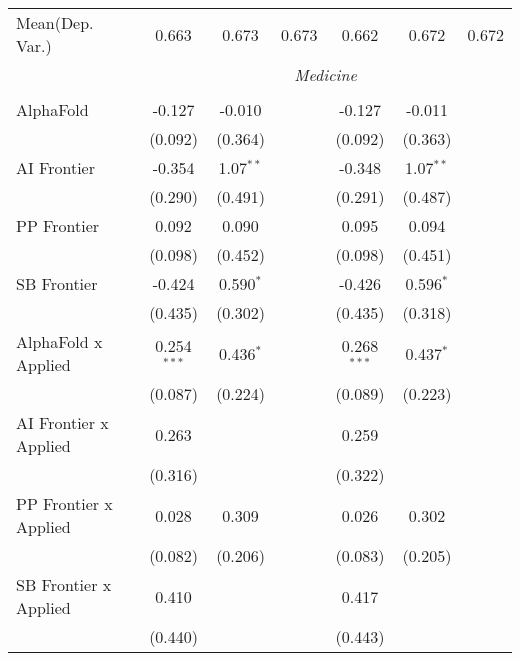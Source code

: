 \begin{tabular}{lcccccc}
Mean(Dep. Var.) & 0.663 & 0.673 & 0.673 & 0.662 & 0.672 & 0.672 \\
 & \multicolumn{6}{c}{\textit{Medicine}} \\ \\
   AlphaFold                    & -0.127        & -0.010      &              & -0.127        & -0.011      &   \\   
                                & (0.092)       & (0.364)     &              & (0.092)       & (0.363)     &   \\   
   AI Frontier                  & -0.354        & 1.07$^{**}$ &              & -0.348        & 1.07$^{**}$ &   \\   
                                & (0.290)       & (0.491)     &              & (0.291)       & (0.487)     &   \\   
   PP Frontier                  & 0.092         & 0.090       &              & 0.095         & 0.094       &   \\   
                                & (0.098)       & (0.452)     &              & (0.098)       & (0.451)     &   \\   
   SB Frontier                  & -0.424        & 0.590$^{*}$ &              & -0.426        & 0.596$^{*}$ &   \\   
                                & (0.435)       & (0.302)     &              & (0.435)       & (0.318)     &   \\   
   AlphaFold x Applied          & 0.254$^{***}$ & 0.436$^{*}$ &              & 0.268$^{***}$ & 0.437$^{*}$ &   \\   
                                & (0.087)       & (0.224)     &              & (0.089)       & (0.223)     &   \\   
   AI Frontier x Applied        & 0.263         &             &              & 0.259         &             &   \\   
                                & (0.316)       &             &              & (0.322)       &             &   \\   
   PP Frontier x Applied        & 0.028         & 0.309       &              & 0.026         & 0.302       &   \\   
                                & (0.082)       & (0.206)     &              & (0.083)       & (0.205)     &   \\   
   SB Frontier x Applied        & 0.410         &             &              & 0.417         &             &   \\   
                                & (0.440)       &             &              & (0.443)       &             &   \\   

\end{tabular}
